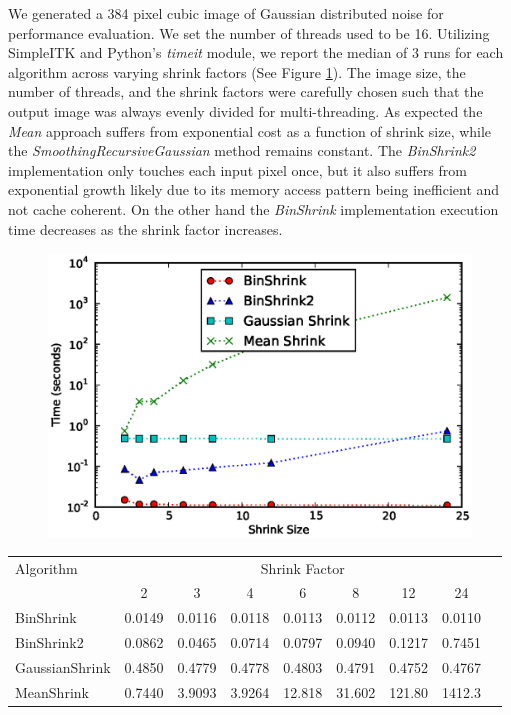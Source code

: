 \documentclass{InsightArticle}
\begin{document}
We generated a 384 pixel cubic image of Gaussian distributed noise for
performance evaluation. We set the number of threads used to be
16. Utilizing SimpleITK and Python's
\textit{timeit} module, we report the median of 3 runs for each
algorithm across varying shrink factors (See Figure
\ref{fig:ShrinkPerformance}).  The image size, the number of threads,
and the shrink factors were carefully chosen such that the output
image was always evenly divided for multi-threading. As expected the
\textit{Mean} approach suffers from exponential cost as a function of
shrink size, while the
\textit{SmoothingRecursiveGaussian} method remains constant. The
\textit{BinShrink2} implementation only touches each input pixel once,
but it also suffers from exponential growth likely due to its memory
access pattern being inefficient and not cache coherent. On the other
hand the \textit{BinShrink} implementation execution time decreases as
the shrink factor increases.

\begin{figure}
  \centering
  \includegraphics[width=0.8\linewidth]{images/shrink_time}
  \label{fig:ShrinkPerformance}
\end{figure}

\begin{table}
\begin{center}
\begin{tabular}{l|*{7}{c}r}
Algorithm & \multicolumn{7}{c}{Shrink Factor} \\
  &            2 & 3 & 4 & 6 & 8 & 12 & 24 \\
\hline
BinShrink &     0.0149 & 0.0116 & 0.0118 & 0.0113 & 0.0112 & 0.0113 & 0.0110\\
BinShrink2 &    0.0862 & 0.0465 & 0.0714 & 0.0797 & 0.0940 & 0.1217 & 0.7451\\
GaussianShrink &0.4850 & 0.4779 & 0.4778 & 0.4803 & 0.4791 & 0.4752 & 0.4767\\
MeanShrink &    0.7440 & 3.9093 & 3.9264 & 12.818 & 31.602 & 121.80 & 1412.3\\
\end{tabular}
\label{tab:ShrinkPerformance}
\end{center}
\end{table}
\end{document}
